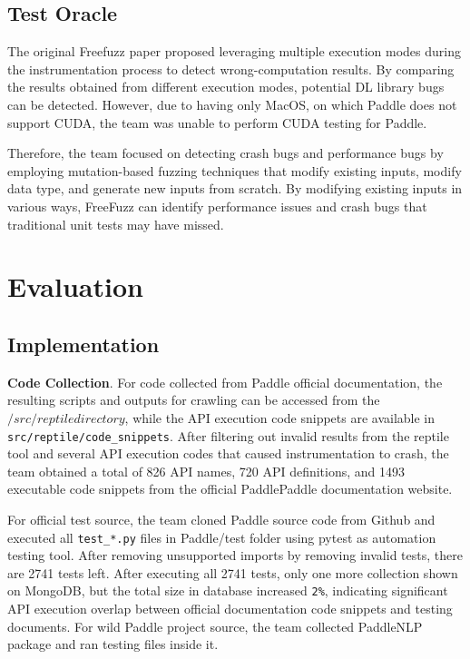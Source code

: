 \documentclass[sigconf]{acmart}
\begin{document}
  \subsection{Test Oracle}
  The original Freefuzz paper proposed leveraging multiple execution modes during the instrumentation process to detect wrong-computation results. 
  By comparing the results obtained from different execution modes, potential DL library bugs can be detected. However, due to having only MacOS, 
  on which Paddle does not support CUDA, the team was unable to perform CUDA testing for Paddle.

  Therefore, the team focused on detecting crash bugs and performance bugs by employing mutation-based fuzzing techniques that modify existing inputs, modify data type, and generate new inputs from scratch. 
  By modifying existing inputs in various ways, FreeFuzz can identify performance issues and crash bugs that traditional unit tests may have missed.

\section{Evaluation}
  \subsection{Implementation}
  \textbf{Code Collection}. For code collected from Paddle official documentation, 
  the resulting scripts and outputs for crawling can be accessed from the $/src/reptile directory$, 
  while the API execution code snippets are available in \verb|src/reptile/code_snippets|. 
  After filtering out invalid results from the reptile tool and several API execution codes that caused instrumentation to crash, 
  the team obtained a total of 826 API names, 720 API definitions, and 1493 executable code snippets from the official PaddlePaddle documentation website.
  \par For official test source, the team cloned Paddle source code from Github and executed all \verb|test_*.py| files in Paddle/test folder using pytest as automation testing tool. 
  After removing unsupported imports by removing invalid tests, there are 2741 tests left. After executing all 2741 tests, only one more collection shown on MongoDB, 
  but the total size in database increased  \verb|2%|, indicating significant API execution overlap between official documentation code snippets and testing documents.
  For wild Paddle project source, the team collected PaddleNLP package and ran testing files inside it.
  
\end{document}
